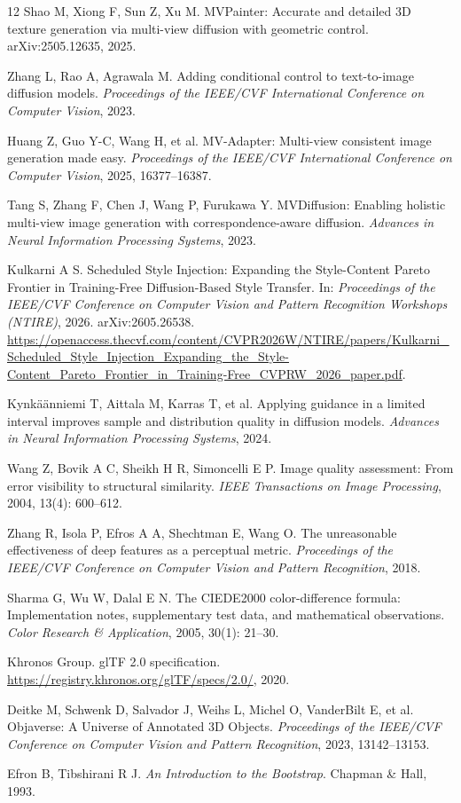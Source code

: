 \documentclass[times,twocolumn,final]{elsarticle}
\begin{document}
\begin{thebibliography}{12}
Shao M, Xiong F, Sun Z, Xu M. MVPainter: Accurate and detailed 3D texture generation via multi-view diffusion with geometric control. arXiv:2505.12635, 2025.

Zhang L, Rao A, Agrawala M. Adding conditional control to text-to-image diffusion models. \textit{Proceedings of the IEEE/CVF International Conference on Computer Vision}, 2023.

Huang Z, Guo Y-C, Wang H, et al. MV-Adapter: Multi-view consistent image generation made easy. \textit{Proceedings of the IEEE/CVF International Conference on Computer Vision}, 2025, 16377--16387.

Tang S, Zhang F, Chen J, Wang P, Furukawa Y. MVDiffusion: Enabling holistic multi-view image generation with correspondence-aware diffusion. \textit{Advances in Neural Information Processing Systems}, 2023.

Kulkarni A S. Scheduled Style Injection: Expanding the Style-Content Pareto Frontier in Training-Free Diffusion-Based Style Transfer. In: \textit{Proceedings of the IEEE/CVF Conference on Computer Vision and Pattern Recognition Workshops (NTIRE)}, 2026. arXiv:2605.26538. \url{https://openaccess.thecvf.com/content/CVPR2026W/NTIRE/papers/Kulkarni_Scheduled_Style_Injection_Expanding_the_Style-Content_Pareto_Frontier_in_Training-Free_CVPRW_2026_paper.pdf}.

Kynk\"a\"anniemi T, Aittala M, Karras T, et al. Applying guidance in a limited interval improves sample and distribution quality in diffusion models. \textit{Advances in Neural Information Processing Systems}, 2024.

Wang Z, Bovik A C, Sheikh H R, Simoncelli E P. Image quality assessment: From error visibility to structural similarity. \textit{IEEE Transactions on Image Processing}, 2004, 13(4): 600--612.

Zhang R, Isola P, Efros A A, Shechtman E, Wang O. The unreasonable effectiveness of deep features as a perceptual metric. \textit{Proceedings of the IEEE/CVF Conference on Computer Vision and Pattern Recognition}, 2018.

Sharma G, Wu W, Dalal E N. The CIEDE2000 color-difference formula: Implementation notes, supplementary test data, and mathematical observations. \textit{Color Research \& Application}, 2005, 30(1): 21--30.

Khronos Group. glTF 2.0 specification. \url{https://registry.khronos.org/glTF/specs/2.0/}, 2020.

Deitke M, Schwenk D, Salvador J, Weihs L, Michel O, VanderBilt E, et al. Objaverse: A Universe of Annotated 3D Objects. \textit{Proceedings of the IEEE/CVF Conference on Computer Vision and Pattern Recognition}, 2023, 13142--13153.

Efron B, Tibshirani R J. \textit{An Introduction to the Bootstrap}. Chapman \& Hall, 1993.
\end{thebibliography}
\end{document}
